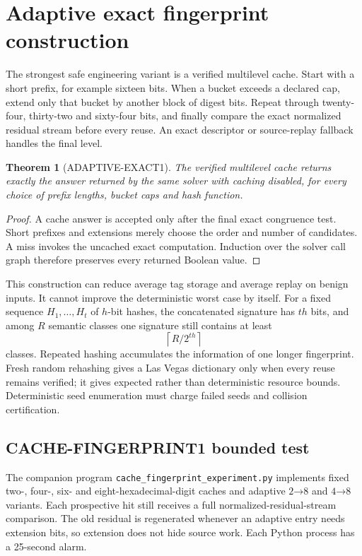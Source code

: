 \documentclass[11pt]{article}
\newtheorem{theorem}{Theorem}
\begin{document}
\section{Adaptive exact fingerprint construction}
The strongest safe engineering variant is a verified multilevel cache.
Start with a short prefix, for example sixteen bits.  When a bucket exceeds a
declared cap, extend only that bucket by another block of digest bits.  Repeat
through twenty-four, thirty-two and sixty-four bits, and finally compare the
exact normalized residual stream before every reuse.  An exact descriptor or
source-replay fallback handles the final level.

\begin{theorem}[ADAPTIVE-EXACT1]
The verified multilevel cache returns exactly the answer returned by the same
solver with caching disabled, for every choice of prefix lengths, bucket caps
and hash function.
\end{theorem}
\begin{proof}
A cache answer is accepted only after the final exact congruence test.
Short prefixes and extensions merely choose the order and number of
candidates.  A miss invokes the uncached exact computation.  Induction over
the solver call graph therefore preserves every returned Boolean value.
\end{proof}

This construction can reduce average tag storage and average replay on
benign inputs.  It cannot improve the deterministic worst case by itself.
For a fixed sequence $H_1,\ldots,H_t$ of $h$-bit hashes, the concatenated
signature has $th$ bits, and among $R$ semantic classes one signature still
contains at least
\[
 \left\lceil R/2^{th}\right\rceil
\]
classes.  Repeated hashing accumulates the information of one longer
fingerprint.  Fresh random rehashing gives a Las Vegas dictionary only when
every reuse remains verified; it gives expected rather than deterministic
resource bounds.  Deterministic seed enumeration must charge failed seeds and
collision certification.

\subsection{CACHE-FINGERPRINT1 bounded test}
The companion program \texttt{cache\_fingerprint\_experiment.py} implements
fixed two-, four-, six- and eight-hexadecimal-digit caches and adaptive
$2\mathord\to8$ and $4\mathord\to8$ variants.  Each prospective hit still
receives a full normalized-residual-stream comparison.  The old residual is
regenerated whenever an adaptive entry needs extension bits, so extension
does not hide source work.  Each Python process has a 25-second alarm.
\end{document}
